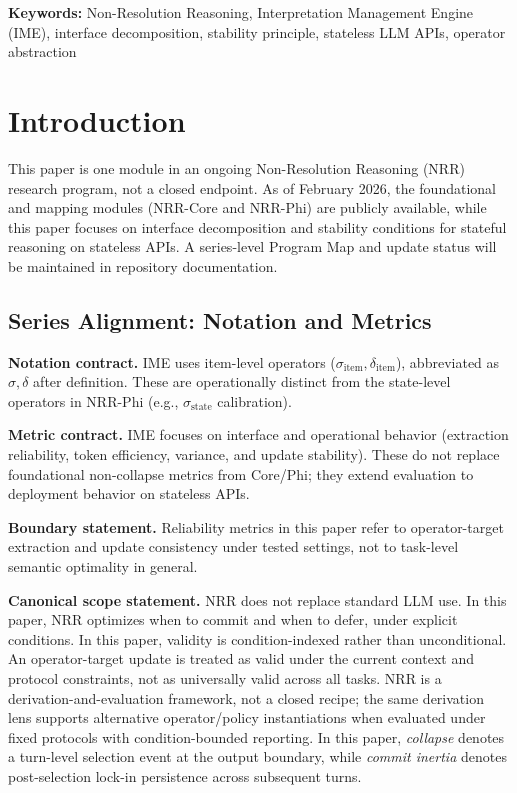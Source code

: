 \documentclass[11pt,a4paper]{article}
\begin{document}
\noindent\textbf{Keywords:} Non-Resolution Reasoning, Interpretation Management Engine (IME),
interface decomposition, stability principle, stateless LLM APIs, operator abstraction

\section{Introduction}
\label{sec:intro}

This paper is one module in an ongoing Non-Resolution Reasoning (NRR) research program, not a closed endpoint. As of February 2026, the foundational and mapping modules (NRR-Core and NRR-Phi) are publicly available, while this paper focuses on interface decomposition and stability conditions for stateful reasoning on stateless APIs. A series-level Program Map and update status will be maintained in repository documentation.

\subsection{Series Alignment: Notation and Metrics}

\textbf{Notation contract.} IME uses item-level operators
($\sigma_{\text{item}}, \delta_{\text{item}}$), abbreviated as $\sigma,\delta$
after definition. These are operationally distinct from the state-level
operators in NRR-Phi (e.g., $\sigma_{\mathrm{state}}$ calibration).

\textbf{Metric contract.} IME focuses on interface and operational behavior
(extraction reliability, token efficiency, variance, and update stability).
These do not replace foundational non-collapse metrics from Core/Phi; they
extend evaluation to deployment behavior on stateless APIs.

\textbf{Boundary statement.} Reliability metrics in this paper refer to
operator-target extraction and update consistency under tested settings, not to
task-level semantic optimality in general.

\textbf{Canonical scope statement.} NRR does not replace standard LLM use.
In this paper, NRR optimizes when to commit and when to defer, under explicit conditions.
In this paper, validity is condition-indexed rather than unconditional.
An operator-target update is treated as valid under the current context and protocol constraints, not as universally valid across all tasks.
NRR is a derivation-and-evaluation framework, not a closed recipe; the same derivation lens supports alternative operator/policy instantiations when evaluated under fixed protocols with condition-bounded reporting.
In this paper, \emph{collapse} denotes a turn-level selection event at the output boundary, while \emph{commit inertia} denotes post-selection lock-in persistence across subsequent turns.
\end{document}
